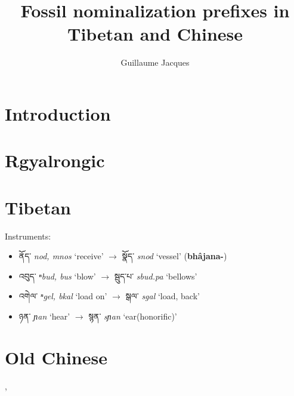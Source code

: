 \documentclass[oneside,a4paper,11pt]{article}
\newcommand{\ipa}[1]{\textbf{{\phon\mbox{#1}}}} %
\newcommand{\tibet}[3]{{\tibetain#1} \textit{\phon#2} `#3'}
\begin{document}
\title{Fossil nominalization prefixes in Tibetan and Chinese}
\author{Guillaume Jacques}
\maketitle

\section{Introduction}

\citet{gong17xingtaixue}
\citet{konnerth16gV}
\citet{jacques14snom}

\section{Rgyalrongic}
\citet{jacques16relatives}
\citet{jacques14linking}
\citet{jackson14morpho}

\section{Tibetan}
\citet{lifk33, coblin76, hill11laws, hill14derivational}


Instruments:
\begin{itemize}
\item \tibet{ནོད་}{nod, mnos}{receive} $\rightarrow$	\tibet{སྣོད་}{snod}{vessel} 	(\ipa{bhâjana-})
\item \tibet{འབུད་}{ⁿbud, bus}{blow} $\rightarrow$	\tibet{སྦུད་པ་}{sbud.pa}{bellows} 
\item \tibet{འགེལ་}{ⁿgel, bkal}{load on} $\rightarrow$	\tibet{སྒལ་}{sgal}{load, back} 
\item \tibet{ཉན་}{ɲan}{hear} $\rightarrow$	\tibet{སྙན་}{sɲan}{ear(honorific)} 
\end{itemize}

\section{Old Chinese}
\citet[73]{sagart99roc}, \citet{sagart12sprefix}
\end{document}

